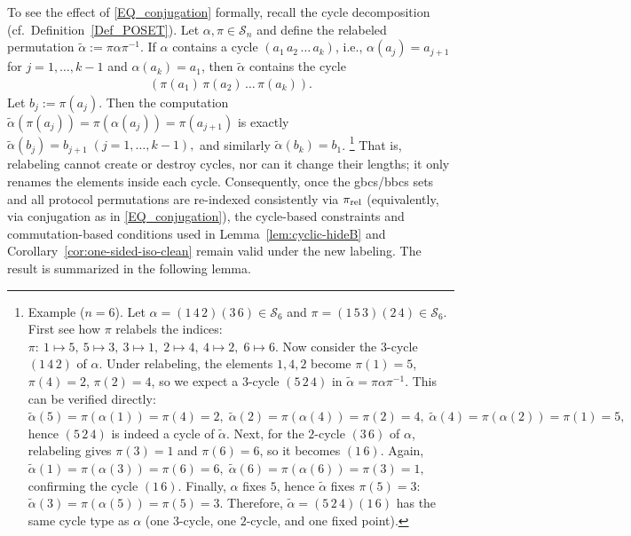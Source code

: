 \documentclass[onecolumn]{IEEEtran} %
\newcommand{\1}{\mathbbm{1}}
\theoremstyle{boldremark}
\begin{document}
To see the effect of \eqref{EQ_conjugation} formally, recall the cycle
decomposition (cf.\ Definition~\ref{Def_POSET}). Let $\alpha,\pi\in\mathcal{S}_n$ and define
the relabeled permutation $\widetilde{\alpha}:=\pi\alpha\pi^{-1}$.
If $\alpha$ contains a cycle $(a_1\,a_2\,\dots\,a_k)$, i.e.,
$\alpha(a_j)=a_{j+1}$ for $j=1,\dots,k-1$ and $\alpha(a_k)=a_1$, then
$\widetilde{\alpha}$ contains the cycle \cite[Proposition~10, p.~125]{DummitFoote2004}
\begin{align}\label{EQ_conjugation2}
(\pi(a_1)\,\pi(a_2)\,\dots\,\pi(a_k)).
\end{align}
Let \(b_j:=\pi(a_j)\). Then the computation
$\widetilde{\alpha}(\pi(a_j))=\pi(\alpha(a_j))=\pi(a_{j+1})$
is exactly $\widetilde{\alpha}(b_j)=b_{j+1}\; (j=1,\dots,k-1),$ and similarly \(\widetilde{\alpha}(b_k)=b_1\).
\footnote{Example ($n=6$).
Let $\alpha=(1\,4\,2)(3\,6)\in\mathcal{S}_6$ and $\pi=(1\,5\,3)(2\,4)\in\mathcal{S}_6$.
First see how $\pi$ relabels the indices:
$\pi:\ 1\mapsto 5,\ 5\mapsto 3,\ 3\mapsto 1,\;2\mapsto 4,\ 4\mapsto 2,\;6\mapsto 6.$
Now consider the $3$-cycle $(1\,4\,2)$ of $\alpha$. Under relabeling, the elements
$1,4,2$ become $\pi(1)=5$, $\pi(4)=2$, $\pi(2)=4$, so we expect a $3$-cycle
$(5\,2\,4)$ in $\widetilde{\alpha}=\pi\alpha\pi^{-1}$.
This can be verified directly:
$\widetilde{\alpha}(5)=\pi(\alpha(1))=\pi(4)=2,\;
\widetilde{\alpha}(2)=\pi(\alpha(4))=\pi(2)=4,\;
\widetilde{\alpha}(4)=\pi(\alpha(2))=\pi(1)=5,$
hence $(5\,2\,4)$ is indeed a cycle of $\widetilde{\alpha}$.
Next, for the $2$-cycle $(3\,6)$ of $\alpha$, relabeling gives $\pi(3)=1$ and
$\pi(6)=6$, so it becomes $(1\,6)$. Again,
$\widetilde{\alpha}(1)=\pi(\alpha(3))=\pi(6)=6,\;\widetilde{\alpha}(6)=\pi(\alpha(6))=\pi(3)=1,$
confirming the cycle $(1\,6)$. Finally, $\alpha$ fixes $5$, hence
$\widetilde{\alpha}$ fixes $\pi(5)=3$:
$\widetilde{\alpha}(3)=\pi(\alpha(5))=\pi(5)=3$.
Therefore,
$\widetilde{\alpha}=(5\,2\,4)(1\,6)$ has the same cycle type as $\alpha$
(one $3$-cycle, one $2$-cycle, and one fixed point).} That is, relabeling cannot create or destroy cycles, nor can it change
their lengths; it only renames the elements inside each cycle. Consequently, once the
\gls{gbcs}/\gls{bbcs} sets and all protocol permutations are re-indexed
consistently via $\pi_{\rm rel}$ (equivalently, via conjugation as in
\eqref{EQ_conjugation}), the cycle-based constraints and commutation-based
conditions used in Lemma~\ref{lem:cyclic-hideB} and
Corollary~\ref{cor:one-sided-iso-clean} remain valid under the new labeling. The result is summarized in the following lemma.
\end{document}
